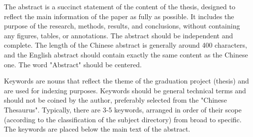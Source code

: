 \begin{eabstract}
\linespread{0.9}\selectfont
The abstract is a succinct statement of the content of the thesis, designed to reflect the main information of the paper as fully as possible. It includes the purpose of the research, methods, results, and conclusions, without containing any figures, tables, or annotations. The abstract should be independent and complete. The length of the Chinese abstract is generally around 400 characters, and the English abstract should contain exactly the same content as the Chinese one. The word "Abstract" should be centered.

Keywords are nouns that reflect the theme of the graduation project (thesis) and are used for indexing purposes. Keywords should be general technical terms and should not be coined by the author, preferably selected from the "Chinese Thesaurus". Typically, there are 3-5 keywords, arranged in order of their scope (according to the classification of the subject directory) from broad to specific. The keywords are placed below the main text of the abstract.


\end{eabstract}
